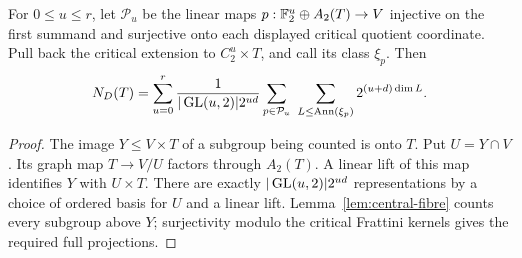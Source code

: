 \begin{proposition}\label{prop:terminal-record}
For $0\leq u\leq r$, let $\mathcal P_u$ be the linear maps
$p:\mathbb F_2^u\oplus A_2(T)\to V$ injective on the first summand and
surjective onto each displayed critical quotient coordinate. Pull back
the critical extension to $C_2^u\times T$, and call its class $\xi_p$.
Then
\begin{equation}\label{eq:terminal-record}
 N_D(T)=\sum_{u=0}^r\frac{1}{|\operatorname{GL}(u,2)|2^{ud}}
 \sum_{p\in\mathcal P_u}\ \sum_{L\leq\operatorname{Ann}(\xi_p)}2^{(u+d)\dim L}.
\end{equation}
\end{proposition}
\begin{proof}
The image $Y\leq V\times T$ of a subgroup being counted is onto $T$.
Put $U=Y\cap V$. Its graph map $T\to V/U$ factors through $A_2(T)$.
A linear lift of this map identifies $Y$ with $U\times T$.
There are exactly $|\operatorname{GL}(u,2)|2^{ud}$ representations by a choice of
ordered basis for $U$ and a linear lift. Lemma~\ref{lem:central-fibre}
counts every subgroup above $Y$; surjectivity modulo the critical
Frattini kernels gives the required full projections.
\end{proof}

